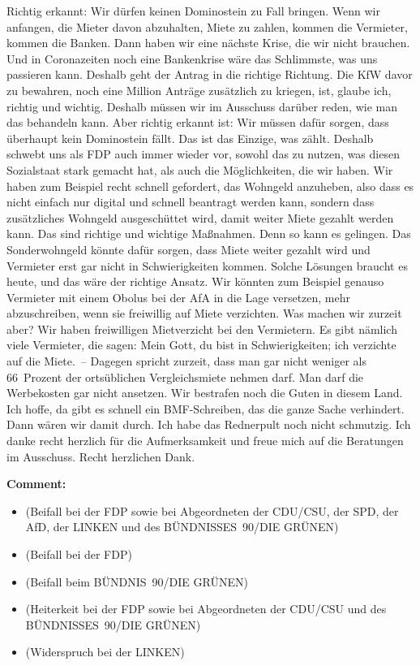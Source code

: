 \documentclass{article}
\begin{document}
Richtig erkannt: Wir dürfen keinen Dominostein zu Fall bringen. Wenn wir anfangen, die Mieter davon abzuhalten, Miete zu zahlen, kommen die Vermieter, kommen die Banken. Dann haben wir eine nächste Krise, die wir nicht brauchen. Und in Coronazeiten noch eine Bankenkrise wäre das Schlimmste, was uns passieren kann. Deshalb geht der Antrag in die richtige Richtung. Die KfW davor zu bewahren, noch eine Million Anträge zusätzlich zu kriegen, ist, glaube ich, richtig und wichtig. Deshalb müssen wir im Ausschuss darüber reden, wie man das behandeln kann. Aber richtig erkannt ist: Wir müssen dafür sorgen, dass überhaupt kein Dominostein fällt. Das ist das Einzige, was zählt. Deshalb schwebt uns als FDP auch immer wieder vor, sowohl das zu nutzen, was diesen Sozialstaat stark gemacht hat, als auch die Möglichkeiten, die wir haben. Wir haben zum Beispiel recht schnell gefordert, das Wohngeld anzuheben, also dass es nicht einfach nur digital und schnell beantragt werden kann, sondern dass zusätzliches Wohngeld ausgeschüttet wird, damit weiter Miete gezahlt werden kann.  Das sind richtige und wichtige Maßnahmen. Denn so kann es gelingen. Das Sonderwohngeld könnte dafür sorgen, dass Miete weiter gezahlt wird und Vermieter erst gar nicht in Schwierigkeiten kommen. Solche Lösungen braucht es heute, und das wäre der richtige Ansatz. Wir könnten zum Beispiel genauso Vermieter mit einem Obolus bei der AfA in die Lage versetzen, mehr abzuschreiben, wenn sie freiwillig auf Miete verzichten.  Was machen wir zurzeit aber? Wir haben freiwilligen Mietverzicht bei den Vermietern. Es gibt nämlich viele Vermieter, die sagen: Mein Gott, du bist in Schwierigkeiten; ich verzichte auf die Miete. – Dagegen spricht zurzeit, dass man gar nicht weniger als 66 Prozent der ortsüblichen Vergleichsmiete nehmen darf. Man darf die Werbekosten gar nicht ansetzen. Wir bestrafen noch die Guten in diesem Land. Ich hoffe, da gibt es schnell ein BMF-Schreiben, das die ganze Sache verhindert. Dann wären wir damit durch. Ich habe das Rednerpult noch nicht schmutzig.  Ich danke recht herzlich für die Aufmerksamkeit und freue mich auf die Beratungen im Ausschuss. Recht herzlichen Dank.  

\noindent\textbf{Comment:}
\begin{itemize}
    \setlength\itemsep{-3pt}
    \item (Beifall bei der FDP sowie bei Abgeordneten der CDU/CSU, der SPD, der AfD, der LINKEN und des BÜNDNISSES 90/DIE GRÜNEN)
    \setlength\itemsep{-3pt}
    \item (Beifall bei der FDP)
    \setlength\itemsep{-3pt}
    \item (Beifall beim BÜNDNIS 90/DIE GRÜNEN)
    \setlength\itemsep{-3pt}
    \item (Heiterkeit bei der FDP sowie bei Abgeordneten der CDU/CSU und des BÜNDNISSES 90/DIE GRÜNEN)
    \setlength\itemsep{-3pt}
    \item (Widerspruch bei der LINKEN)
\end{itemize}
\end{document}
